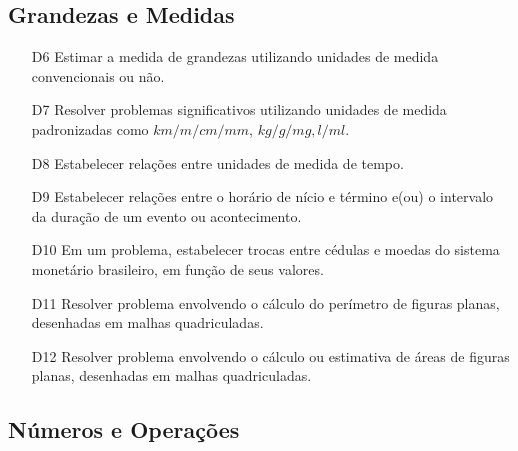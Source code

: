 \subsection{Grandezas e Medidas}
\begin{enumerate}
    \item[D6] \label{itm5:D6} Estimar a medida de grandezas utilizando unidades de medida convencionais ou não.
    \item[D7] \label{itm5:D7} Resolver problemas significativos utilizando unidades de medida padronizadas como $km/m/cm/mm$, $kg/g/mg, l/ml$.
    \item[D8] \label{itm5:D8} Estabelecer relações entre unidades de medida de tempo.
    \item[D9] \label{itm5:D9} Estabelecer relações entre o horário de nício e término e(ou) o intervalo da duração de um evento ou acontecimento.
    \item[D10] \label{itm5:D10} Em um problema, estabelecer trocas entre cédulas e moedas do sistema monetário brasileiro, em função de seus valores.
    \item[D11] \label{itm5:D11} Resolver problema envolvendo o cálculo do perímetro de figuras planas, desenhadas em malhas quadriculadas.
    \item[D12] \label{itm5:D12} Resolver problema envolvendo o cálculo ou estimativa de áreas de figuras planas, desenhadas em malhas quadriculadas.
\end{enumerate}
\subsection{Números e Operações}

